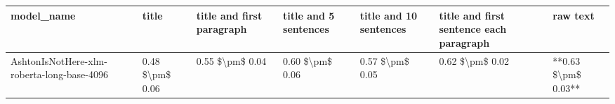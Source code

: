 \begin{tabular}{lllllll}
\toprule
                                model\_name &           title & title and first paragraph & title and 5 sentences & title and 10 sentences & title and first sentence each paragraph &            raw text \\
\midrule
AshtonIsNotHere-xlm-roberta-long-base-4096 & 0.48 \$\textbackslash pm\$ 0.06 &           0.55 \$\textbackslash pm\$ 0.04 &       0.60 \$\textbackslash pm\$ 0.06 &        0.57 \$\textbackslash pm\$ 0.05 &                         0.62 \$\textbackslash pm\$ 0.02 & **0.63 \$\textbackslash pm\$ 0.03** \\
\bottomrule
\end{tabular}
